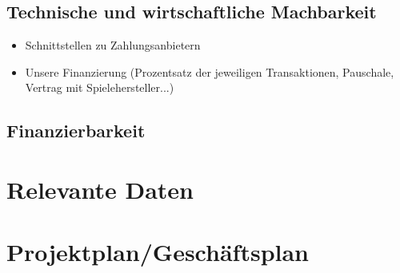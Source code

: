 \documentclass[a4paper,10pt]{article}
\begin{document}
\subsection{Technische und wirtschaftliche Machbarkeit}
\begin{itemize}
  \item Schnittstellen zu Zahlungsanbietern
  \item Unsere Finanzierung (Prozentsatz der jeweiligen Transaktionen, Pauschale, Vertrag mit Spielehersteller...)
\end{itemize}

\subsection{Finanzierbarkeit}


\section{Relevante Daten}

\section{Projektplan/Geschäftsplan}
\end{document}
